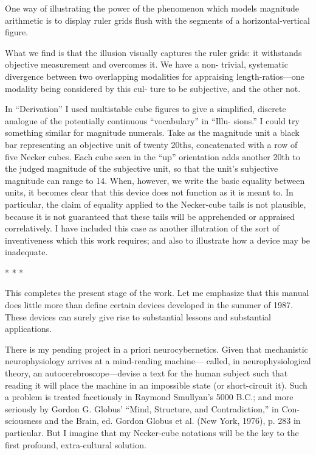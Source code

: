 One way of illustrating the power of the phenomenon which 
models magnitude arithmetic is to display ruler grids flush with the 
segments of a horizontal-vertical figure. 


What we find is that the illusion visually captures the ruler grids: it 
withstands objective measurement and overcomes it. We have a non- 
trivial, systematic divergence between two overlapping modalities for 
appraising length-ratios—one modality being considered by this cul- 
ture to be subjective, and the other not. 


In “Derivation” I used multistable cube figures to give a simplified, 
discrete analogue of the potentially continuous “vocabulary” in “Illu- 
sions.” I could try something similar for magnitude numerals. Take as 
the magnitude unit a black bar representing an objective unit of twenty 
20ths, concatenated with a row of five Necker cubes. Each cube seen in 
the “up” orientation adds another 20th to the judged magnitude of the 
subjective unit, so that the unit’s subjective magnitude can range to 14. 
When, however, we write the basic equality between units, it becomes 
clear that this device does not function as it is meant to. In particular, 
the claim of equality applied to the Necker-cube tails is not plausible, 
because it is not guaranteed that these tails will be apprehended or 
appraised correlatively. I have included this case as another illutration 
of the sort of inventiveness which this work requires; and also to 
illustrate how a device may be inadequate. 


* * * 


This completes the present stage of the work. Let me emphasize 
that this manual does little more than define certain devices developed 
in the summer of 1987. These devices can surely give rise to substantial 
lessons and substantial applications. 

There is my pending project in a priori neurocybernetics. Given 
that mechanistic neurophysiology arrives at a mind-reading machine— 
called, in neurophysiological theory, an autocerebroscope—devise a 
text for the human subject such that reading it will place the machine in 
an impossible state (or short-circuit it). Such a problem is treated 
facetiously in Raymond Smullyan’s 5000 B.C.; and more seriously by 
Gordon G. Globus’ “Mind, Structure, and Contradiction,” in Con- 
sciousness and the Brain, ed. Gordon Globus et al. (New York, 1976), p. 
283 in particular. But I imagine that my Necker-cube notations will be 
the key to the first profound, extra-cultural solution. 

